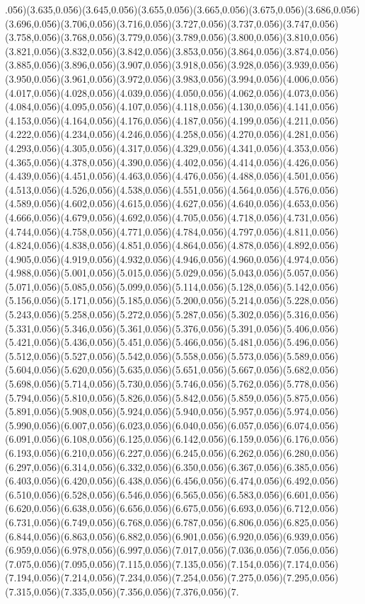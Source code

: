 \documentclass[smallextended]{svjour3}
\begin{document}
.056)(3.635,0.056)(3.645,0.056)(3.655,0.056)(3.665,0.056)(3.675,0.056)(3.686,0.056)(3.696,0.056)(3.706,0.056)(3.716,0.056)(3.727,0.056)(3.737,0.056)(3.747,0.056)(3.758,0.056)(3.768,0.056)(3.779,0.056)(3.789,0.056)(3.800,0.056)(3.810,0.056)(3.821,0.056)(3.832,0.056)(3.842,0.056)(3.853,0.056)(3.864,0.056)(3.874,0.056)(3.885,0.056)(3.896,0.056)(3.907,0.056)(3.918,0.056)(3.928,0.056)(3.939,0.056)(3.950,0.056)(3.961,0.056)(3.972,0.056)(3.983,0.056)(3.994,0.056)(4.006,0.056)(4.017,0.056)(4.028,0.056)(4.039,0.056)(4.050,0.056)(4.062,0.056)(4.073,0.056)(4.084,0.056)(4.095,0.056)(4.107,0.056)(4.118,0.056)(4.130,0.056)(4.141,0.056)(4.153,0.056)(4.164,0.056)(4.176,0.056)(4.187,0.056)(4.199,0.056)(4.211,0.056)(4.222,0.056)(4.234,0.056)(4.246,0.056)(4.258,0.056)(4.270,0.056)(4.281,0.056)(4.293,0.056)(4.305,0.056)(4.317,0.056)(4.329,0.056)(4.341,0.056)(4.353,0.056)(4.365,0.056)(4.378,0.056)(4.390,0.056)(4.402,0.056)(4.414,0.056)(4.426,0.056)(4.439,0.056)(4.451,0.056)(4.463,0.056)(4.476,0.056)(4.488,0.056)(4.501,0.056)(4.513,0.056)(4.526,0.056)(4.538,0.056)(4.551,0.056)(4.564,0.056)(4.576,0.056)(4.589,0.056)(4.602,0.056)(4.615,0.056)(4.627,0.056)(4.640,0.056)(4.653,0.056)(4.666,0.056)(4.679,0.056)(4.692,0.056)(4.705,0.056)(4.718,0.056)(4.731,0.056)(4.744,0.056)(4.758,0.056)(4.771,0.056)(4.784,0.056)(4.797,0.056)(4.811,0.056)(4.824,0.056)(4.838,0.056)(4.851,0.056)(4.864,0.056)(4.878,0.056)(4.892,0.056)(4.905,0.056)(4.919,0.056)(4.932,0.056)(4.946,0.056)(4.960,0.056)(4.974,0.056)(4.988,0.056)(5.001,0.056)(5.015,0.056)(5.029,0.056)(5.043,0.056)(5.057,0.056)(5.071,0.056)(5.085,0.056)(5.099,0.056)(5.114,0.056)(5.128,0.056)(5.142,0.056)(5.156,0.056)(5.171,0.056)(5.185,0.056)(5.200,0.056)(5.214,0.056)(5.228,0.056)(5.243,0.056)(5.258,0.056)(5.272,0.056)(5.287,0.056)(5.302,0.056)(5.316,0.056)(5.331,0.056)(5.346,0.056)(5.361,0.056)(5.376,0.056)(5.391,0.056)(5.406,0.056)(5.421,0.056)(5.436,0.056)(5.451,0.056)(5.466,0.056)(5.481,0.056)(5.496,0.056)(5.512,0.056)(5.527,0.056)(5.542,0.056)(5.558,0.056)(5.573,0.056)(5.589,0.056)(5.604,0.056)(5.620,0.056)(5.635,0.056)(5.651,0.056)(5.667,0.056)(5.682,0.056)(5.698,0.056)(5.714,0.056)(5.730,0.056)(5.746,0.056)(5.762,0.056)(5.778,0.056)(5.794,0.056)(5.810,0.056)(5.826,0.056)(5.842,0.056)(5.859,0.056)(5.875,0.056)(5.891,0.056)(5.908,0.056)(5.924,0.056)(5.940,0.056)(5.957,0.056)(5.974,0.056)(5.990,0.056)(6.007,0.056)(6.023,0.056)(6.040,0.056)(6.057,0.056)(6.074,0.056)(6.091,0.056)(6.108,0.056)(6.125,0.056)(6.142,0.056)(6.159,0.056)(6.176,0.056)(6.193,0.056)(6.210,0.056)(6.227,0.056)(6.245,0.056)(6.262,0.056)(6.280,0.056)(6.297,0.056)(6.314,0.056)(6.332,0.056)(6.350,0.056)(6.367,0.056)(6.385,0.056)(6.403,0.056)(6.420,0.056)(6.438,0.056)(6.456,0.056)(6.474,0.056)(6.492,0.056)(6.510,0.056)(6.528,0.056)(6.546,0.056)(6.565,0.056)(6.583,0.056)(6.601,0.056)(6.620,0.056)(6.638,0.056)(6.656,0.056)(6.675,0.056)(6.693,0.056)(6.712,0.056)(6.731,0.056)(6.749,0.056)(6.768,0.056)(6.787,0.056)(6.806,0.056)(6.825,0.056)(6.844,0.056)(6.863,0.056)(6.882,0.056)(6.901,0.056)(6.920,0.056)(6.939,0.056)(6.959,0.056)(6.978,0.056)(6.997,0.056)(7.017,0.056)(7.036,0.056)(7.056,0.056)(7.075,0.056)(7.095,0.056)(7.115,0.056)(7.135,0.056)(7.154,0.056)(7.174,0.056)(7.194,0.056)(7.214,0.056)(7.234,0.056)(7.254,0.056)(7.275,0.056)(7.295,0.056)(7.315,0.056)(7.335,0.056)(7.356,0.056)(7.376,0.056)(7.
\end{document}
